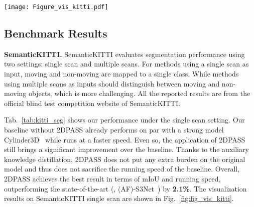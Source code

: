 \documentclass[runningheads]{llncs}
\begin{document}
	\begin{figure*}[t]
		\begin{centering}
			\texttt{[image: Figure\_vis\_kitti.pdf]}
			\caption{{Qualitative results of 2DPASS on the validation set of SemanticKITTI. Our baseline has a higher error recognizing small objects and region boundaries, while 2DPASS recognizes small objects better thanks to the prior of 2D modality.} 
			}
			\label{fig:fig_vis_kitti}
		\end{centering}	
	\end{figure*}
	
	
	
	\subsection{Benchmark Results}
	\noindent\textbf{SemanticKITTI.}
	SemanticKITTI evaluates segmentation performance using two settings: single scan and multiple scans.
For methods using a single scan as input, moving and non-moving are mapped to a single class. While methods using multiple scans as inputs should distinguish between moving and non-moving objects, which is more challenging.
All the reported results are from the official blind test competition website of SemanticKITTI.
	
	Tab.~\ref{tab:kitti_seg} shows our performance under the single scan setting.
Our baseline without 2DPASS already performs on par with a strong model Cylinder3D~\cite{zhou2020cylinder3d} while runs at a faster speed.
Even so, the application of 2DPASS still brings a significant improvement over the baseline.
Thanks to the auxiliary knowledge distillation,  2DPASS does not put any extra burden on the original model and thus does not sacrifice the running speed of the baseline.
Overall, 2DPASS achieves the best result in terms of mIoU and running speed, outperforming the state-of-the-art (\ie,  (AF)-S3Net~\cite{cheng20212}) by {\textbf{2.1\%}}.
The visualization results on SemanticKITTI single scan are shown in Fig.~\ref{fig:fig_vis_kitti}.
	
\end{document}
